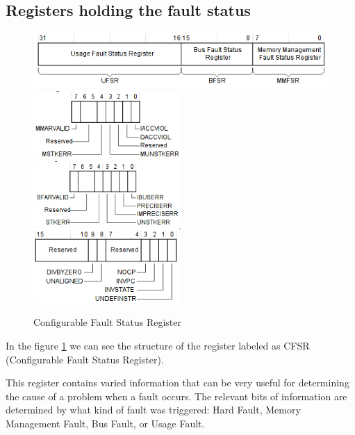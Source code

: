 \subsection{Registers holding the fault status}

\begin{figure}[H]
  \begin{center}
    \includegraphics[width=\textwidth]{images/CFSR} \\
    \includegraphics[width=0.5\textwidth]{images/MMFSR} \\
    \includegraphics[width=0.5\textwidth]{images/BFSR} \\
    \includegraphics[width=0.5\textwidth]{images/UFSR}
  \end{center}
  \caption{Configurable Fault Status Register}
  \label{fig:CFSR}
\end{figure}

In the figure \ref{fig:CFSR} we can see the structure of the register labeled as CFSR (Configurable Fault Status Register).

This register contains varied information that can be very useful for determining the cause of a problem when a fault occurs. The relevant bits of information are determined by what kind of fault was triggered: Hard Fault, Memory Management Fault, Bus Fault, or Usage Fault.

